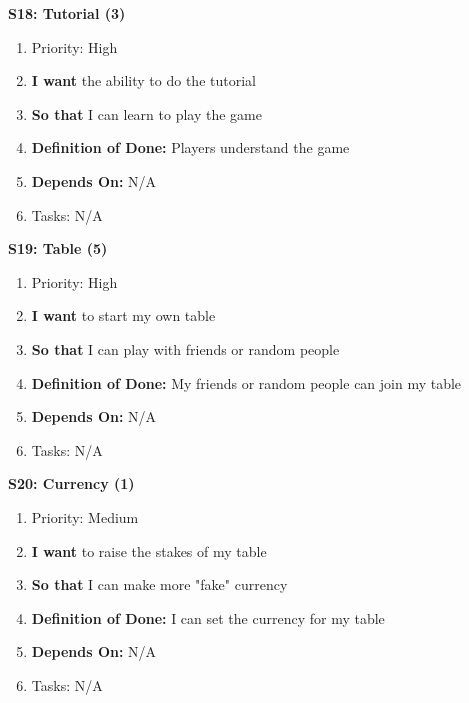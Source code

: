 \textbf{S18: Tutorial (3)}
\begin{enumerate}
    \item Priority: High
    \item \textbf{I want} the ability to do the tutorial 
    \item \textbf{So that} I can learn to play the game
    \item \textbf{Definition of Done:} Players understand the game
    \item \textbf{Depends On:} N/A
    \item Tasks: N/A
\end{enumerate}


\textbf{S19: Table (5)}
\begin{enumerate}
    \item Priority: High
    \item \textbf{I want} to start my own table 
    \item \textbf{So that} I can play with friends or random people
    \item \textbf{Definition of Done:} My friends or random people can join my table
    \item \textbf{Depends On:} N/A
    \item Tasks: N/A
\end{enumerate}


\textbf{S20: Currency (1)}
\begin{enumerate}
    \item Priority: Medium
    \item \textbf{I want} to raise the stakes of my table
    \item \textbf{So that} I can make more "fake" currency
    \item \textbf{Definition of Done:} I can set the currency for my table
    \item \textbf{Depends On:} N/A
    \item Tasks: N/A
\end{enumerate}


